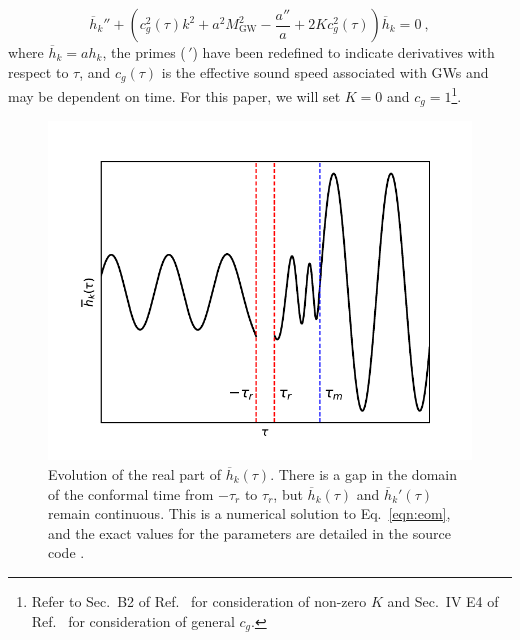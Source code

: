 \documentclass[prd,twocolumn,aps,psfig,nofootinbib,nobibnotes,superscriptaddress,preprintnumbers,times]{revtex4-2}
\begin{document}
\begin{equation}\label{eqn:eom}
    \overline{h}_k'' + \left(c_g^2(\tau) k^2 + a^2 M_\text{GW}^2 - \frac{a''}{a} + 2Kc_g^2(\tau)\right)\overline{h}_k = 0 \ ,
\end{equation}
where $\overline{h}_k = ah_k$, the primes ($\,'$) have been redefined to indicate derivatives with respect to $\tau$, and $c_g(\tau)$ is the effective sound speed associated with GWs and may be dependent on time. For this paper, we will set $K = 0$ and $c_g = 1$\footnote{Refer to Sec.\ B2 of Ref.\ \cite{Gumrukcuoglu:2012wt} for consideration of non-zero $K$ and Sec.\ IV E4 of Ref.\ \cite{Gumrukcuoglu:2012wt} for consideration of general $c_g$.}.

\begin{figure}[t]
\centering
\includegraphics[scale=0.65]{fig1.pdf}
\caption{Evolution of the real part of $\overline{h}_k(\tau)$. There is a gap in the domain of the conformal time from $-\tau_r$ to $\tau_r$, but $\overline{h}_k(\tau)$ and $\overline{h}_k'(\tau)$ remain continuous. This is a numerical solution to Eq.\ \ref{eqn:eom}, and the exact values for the parameters are detailed in the source code \cite{GH}.}
 \label{fig:mode}
\end{figure}
\end{document}
